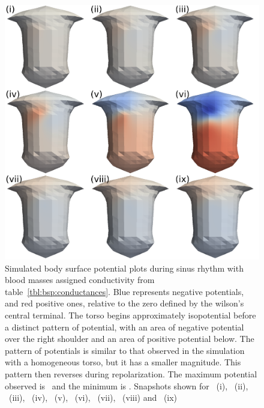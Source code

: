 \begin{figure}
\includegraphics{figures/bsp/bsp_blood}
\caption[Body Surface Potential snapshots, with blood masses]{
\label{bsp:fig:blood_bsp}
Simulated body surface potential plots during sinus rhythm with blood masses assigned
conductivity from table~\ref{tbl:bsp:conductances}.
Blue represents negative potentials, and red positive ones, relative to the zero
defined by the wilson's central terminal.
The torso begins approximately isopotential before a distinct pattern of
potential, with an area of negative potential over the right shoulder and an
area of positive potential below.
The pattern of potentials is similar to that observed in the simulation with a
homogeneous torso, but it has a smaller magnitude.
This pattern then reverses during repolarization.
The maximum potential observed is \ and the minimum is .
Snapshots shown for \ (i), \ (ii), \ (iii), \ (iv),
\ (v), \ (vi), \ (vii), \ (viii) and \
(ix)
}
\end{figure}

